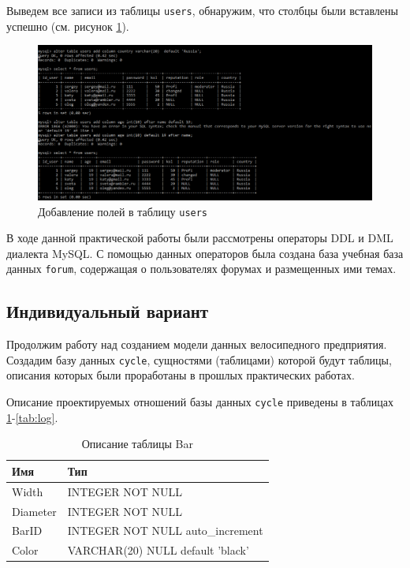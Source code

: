 \documentclass[a4paper,14pt]{extarticle}
\newcommand{\individual}{Индивидуальный вариант~}
\begin{document}
Выведем все записи из таблицы \texttt{users}, обнаружим, что столбцы были вставлены успешно (см. рисунок \ref{fig:alter-add-forum}).

\begin{figure}[h!]
	\centering
	\includegraphics[width=0.6\linewidth]{images/alter-add-forum}
	\caption{Добавление полей в таблицу \texttt{users}}
	\label{fig:alter-add-forum}
\end{figure}

В ходе данной практической работы были рассмотрены операторы DDL и DML диалекта MySQL. С помощью данных операторов была создана база учебная база данных \texttt{forum}, содержащая о пользователях форумах и размещенных ими темах.

\subsection{\individual}

Продолжим работу над созданием модели данных велосипедного предприятия. Создадим базу данных \texttt{cycle}, сущностями (таблицами) которой будут таблицы, описания которых были проработаны в прошлых практических работах. 

Описание проектируемых отношений базы данных \texttt{cycle} приведены в таблицах \ref{tab:bar}-\ref{tab:log}.

\begin{table}[h!] 
 \centering
	\caption{Описание таблицы Bar}
	\begin{tabular}{|l|l|}
  \hline \textbf{Имя} & \textbf{Тип} \\
		\hline
		Width & INTEGER NOT NULL \\ \hline
		Diameter & INTEGER NOT NULL \\ \hline
		BarID & INTEGER NOT NULL auto\_increment \\ \hline
		Color & VARCHAR(20) NULL default 'black' \\ \hline
	\end{tabular}
	\label{tab:bar}
\end{table}
\end{document}
